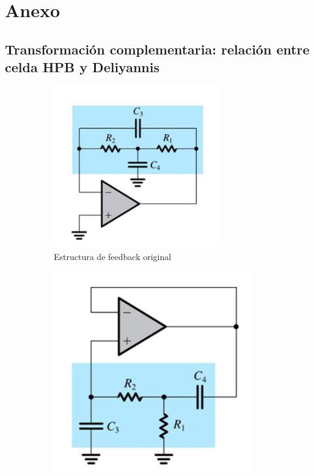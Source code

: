 \documentclass[../../tc_tp5_main.tex]{subfiles}
\begin{document}
\section{Anexo}

\subsection{Transformaci\'on complementaria: relaci\'on entre celda HPB y Deliyannis}

\begin{figure}[H]	%
	\centering
	\begin{subfigure}[t]{0.35\textwidth}
		\centering
		\includegraphics[width=0.8\textwidth]{imagenes/comp_trans_before.png}
		\caption{Estructura de feedback original}
		\label{fig:ej3_comp_trans_before}
	\end{subfigure}%
	\hfill
	\begin{subfigure}[t]{0.3\textwidth}
		\centering
		\includegraphics[width=\textwidth]{imagenes/comp_trans_after.png}

\end{subfigure}
\end{figure}
\end{document}
